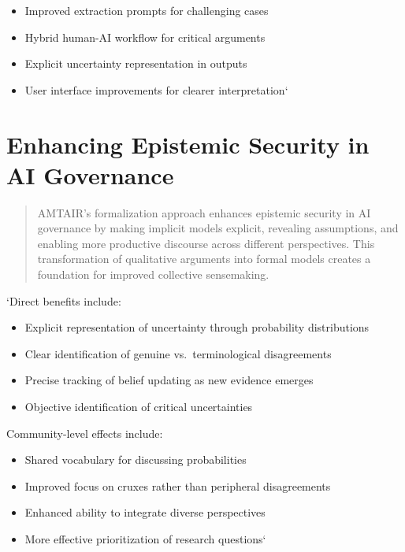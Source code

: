 \documentclass[]{book}
\providecommand{\tightlist}{%
  \setlength{\itemsep}{0pt}\setlength{\parskip}{0pt}}
\begin{document}
\begin{itemize}
\tightlist
\item
  Improved extraction prompts for challenging cases
\item
  Hybrid human-AI workflow for critical arguments
\item
  Explicit uncertainty representation in outputs
\item
  User interface improvements for clearer interpretation`
\end{itemize}

\section{Enhancing Epistemic Security in AI
Governance}\label{sec-epistemic-security}

\begin{quote}
AMTAIR's formalization approach enhances epistemic security in AI
governance by making implicit models explicit, revealing assumptions,
and enabling more productive discourse across different perspectives.
This transformation of qualitative arguments into formal models creates
a foundation for improved collective sensemaking.
\end{quote}

`Direct benefits include:

\begin{itemize}
\tightlist
\item
  Explicit representation of uncertainty through probability
  distributions
\item
  Clear identification of genuine vs.~terminological disagreements
\item
  Precise tracking of belief updating as new evidence emerges
\item
  Objective identification of critical uncertainties
\end{itemize}

Community-level effects include:

\begin{itemize}
\tightlist
\item
  Shared vocabulary for discussing probabilities
\item
  Improved focus on cruxes rather than peripheral disagreements
\item
  Enhanced ability to integrate diverse perspectives
\item
  More effective prioritization of research questions`
\end{itemize}
\end{document}
